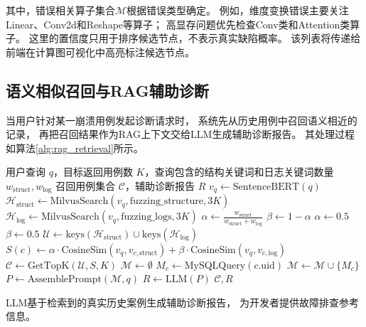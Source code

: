 其中，错误相关算子集合$\mathcal{M}$根据错误类型确定。
例如，维度变换错误主要关注Linear、Conv2d和Reshape等算子；
高显存问题优先检查Conv类和Attention类算子。
这里的置信度只用于排序候选节点，不表示真实缺陷概率。
该列表将传递给前端在计算图可视化中高亮标注候选节点。

\subsection{语义相似召回与RAG辅助诊断}

当用户针对某一崩溃用例发起诊断请求时，
系统先从历史用例中召回语义相近的记录，
再把召回结果作为RAG上下文交给LLM生成辅助诊断报告。
其处理过程如算法\ref{alg:rag_retrieval}所示。

\begin{algorithm}[H]
\caption{语义相似召回与RAG辅助诊断算法}
\label{alg:rag_retrieval}
\small\linespread{1.0}\selectfont
\begin{algorithmic}[1]
\REQUIRE 用户查询 $q$，目标返回用例数 $K$，查询包含的结构关键词和日志关键词数量 $w_{\text{struct}}, w_{\text{log}}$
\ENSURE 召回用例集合 $\mathcal{C}$，辅助诊断报告 $R$
\STATE $v_q \leftarrow \text{SentenceBERT}(q)$
\STATE $\mathcal{H}_{\text{struct}} \leftarrow \text{MilvusSearch}(v_q, \text{fuzzing\_structure}, 3K)$
\STATE $\mathcal{H}_{\text{log}} \leftarrow \text{MilvusSearch}(v_q, \text{fuzzing\_logs}, 3K)$
    \STATE $\alpha \leftarrow \frac{w_{\text{struct}}}{w_{\text{struct}} + w_{\text{log}}}$
    \STATE $\beta \leftarrow 1 - \alpha$
\ELSE
    \STATE $\alpha \leftarrow 0.5$
    \STATE $\beta \leftarrow 0.5$
\ENDIF
\STATE $\mathcal{U} \leftarrow \text{keys}(\mathcal{H}_{\text{struct}}) \cup \text{keys}(\mathcal{H}_{\text{log}})$
    \STATE $S(c) \leftarrow \alpha \cdot \text{CosineSim}(v_q, v_{c,\text{struct}}) + \beta \cdot \text{CosineSim}(v_q, v_{c,\text{log}})$
\ENDFOR
\STATE $\mathcal{C} \leftarrow \text{GetTopK}(\mathcal{U}, S, K)$
\STATE $\mathcal{M} \leftarrow \emptyset$
    \STATE $M_c \leftarrow \text{MySQLQuery}(c.\text{uid})$
    \STATE $\mathcal{M} \leftarrow \mathcal{M} \cup \{M_c\}$
\ENDFOR
\STATE $P \leftarrow \text{AssemblePrompt}(\mathcal{M}, q)$
\STATE $R \leftarrow \text{LLM}(P)$
\RETURN $\mathcal{C}, R$
\end{algorithmic}
\end{algorithm}

LLM基于检索到的真实历史案例生成辅助诊断报告，
为开发者提供故障排查参考信息。

